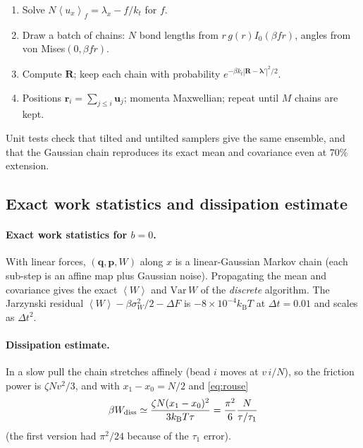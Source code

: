 \documentclass[11pt,a4paper]{article}
\newcommand{\kT}{k_{\mathrm B}T}
\newcommand{\avg}[1]{\left\langle #1\right\rangle}
\newcommand{\lam}{\bm{\lambda}}
\newcommand{\Wd}{W_{\rm diss}}
\begin{document}
\begin{note}
\begin{enumerate}[leftmargin=*,itemsep=0pt]
\item Solve $N\avg{u_x}_f=\lambda_x-f/k_t$ for $f$.
\item Draw a batch of chains: $N$ bond lengths from $r\,g(r)I_0(\beta fr)$, angles from von Mises$(0,\beta fr)$.
\item Compute $\bm R$; keep each chain with probability $e^{-\beta k_t|\bm R-\lam'|^2/2}$.
\item Positions $\bm r_i=\sum_{j\le i}\bm u_j$; momenta Maxwellian; repeat until $M$ chains are kept.
\end{enumerate}
\end{note}
\noindent Unit tests check that tilted and untilted samplers give the same ensemble, and that the
Gaussian chain reproduces its exact mean and covariance even at $70\%$ extension.

\subsection{Exact work statistics and dissipation estimate}
\paragraph{Exact work statistics for $b=0$.} With linear forces, $(\bm q,\bm p,W)$ along $x$ is a
linear-Gaussian Markov chain (each sub-step is an affine map plus Gaussian noise). Propagating the mean and covariance
gives the exact $\avg W$ and $\mathrm{Var}\,W$ of the \emph{discrete} algorithm. The Jarzynski residual
$\avg W-\beta\sigma_W^2/2-\Delta F$ is $-8\times10^{-4}\kT$ at $\Delta t=0.01$ and scales as $\Delta t^2$.

\paragraph{Dissipation estimate.} In a slow pull the chain stretches affinely (bead $i$ moves at
$v\,i/N$), so the friction power is $\zeta Nv^2/3$, and with $x_1-x_0=N/2$ and \eqref{eq:rouse}
\begin{equation}
\beta\Wd\simeq\frac{\zeta N(x_1-x_0)^2}{3\kT\tau}=\frac{\pi^2}{6}\frac{N}{\tau/\tau_1}
\label{eq:affine}
\end{equation}
(the first version had $\pi^2/24$ because of the $\tau_1$ error).

\end{document}
